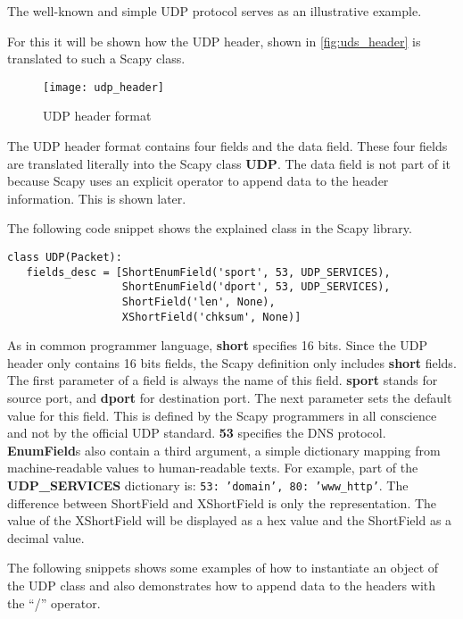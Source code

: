 The well-known and simple UDP protocol \cite{rfc768} serves as an illustrative example.

For this it will be shown how the UDP header, shown in \autoref{fig:uds_header} is translated to such a Scapy class.

\begin{figure}[h]
    \centering
    \texttt{[image: udp\_header]}
    \caption{UDP header format \cite{udp_header}}
    \label{fig:uds_header}
\end{figure}

The UDP header format contains four fields and the data field. These four fields are translated literally into the Scapy class \textbf{UDP}. The data field is not part of it because Scapy uses an explicit operator to append data to the header information. This is shown later.

The following code snippet shows the explained class in the Scapy library.

\begin{samepage}
\begin{verbatim}
class UDP(Packet):
   fields_desc = [ShortEnumField('sport', 53, UDP_SERVICES),
                  ShortEnumField('dport', 53, UDP_SERVICES),
                  ShortField('len', None),
                  XShortField('chksum', None)]
\end{verbatim}
\end{samepage}

As in common programmer language, \textbf{short} specifies 16 bits. Since the UDP header only contains 16 bits fields, the Scapy definition only includes \textbf{short} fields. The first parameter of a field is always the name of this field. \textbf{sport} stands for source port, and \textbf{dport} for destination port.
The next parameter sets the default value for this field. This is defined by the Scapy programmers in all conscience and not by the official UDP standard. \textbf{53} specifies the DNS protocol.
\textbf{EnumField}s also contain a third argument, a simple dictionary mapping from machine-readable values to human-readable texts. For example, part of the \textbf{UDP\_SERVICES} dictionary is: \texttt{{53: 'domain', 80: 'www_http'}}.
The difference between ShortField and XShortField is only the representation. The value of the XShortField will be displayed as a hex value and the ShortField as a decimal value.

The following snippets shows some examples of how to instantiate an object of the UDP class and also demonstrates how to append data to the headers with the “/” operator.


